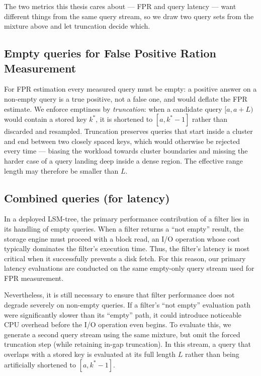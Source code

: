The two metrics this thesis cares about --- FPR and query latency
--- want different things from the same query stream, so we draw
two query sets from the mixture above and let truncation decide
which.

\subsection{Empty queries for False Positive Ration Measurement}
\label{subsec:queries-empty}

For FPR estimation every measured query must be empty: a positive
answer on a non-empty query is a true positive, not a false one,
and would deflate the FPR estimate. We enforce emptiness by
\emph{truncation}: when a candidate query $[a, a+L)$ would contain
a stored key $k^*$, it is shortened to $[a, k^* - 1]$ rather than
discarded and resampled. Truncation preserves queries that start
inside a cluster and end between two closely spaced keys, which
would otherwise be rejected every time --- biasing the workload
towards cluster boundaries and missing the harder case of a query
landing deep inside a dense region. The effective range length
may therefore be smaller than $L$.

\subsection{Combined queries (for latency)}
\label{subsec:queries-combined}

In a deployed LSM-tree, the primary performance contribution of a filter
lies in its handling of empty queries. When a filter returns a
``not empty'' result, the storage engine must proceed with a block read,
an I/O operation whose cost typically dominates the filter's execution time.
Thus, the filter's latency is most critical when it successfully prevents
a disk fetch. For this reason, our primary latency evaluations are
conducted on the same empty-only query stream used for FPR measurement.

Nevertheless, it is still necessary to ensure that filter performance does
not degrade severely on non-empty queries. If a filter's ``not empty''
evaluation path were significantly slower than its ``empty'' path, it could
introduce noticeable CPU overhead before the I/O operation even begins.
To evaluate this, we generate a second query stream using the same mixture,
but omit the forced truncation step (while retaining in-gap truncation).
In this stream, a query that overlaps with a stored key is evaluated at
its full length $L$ rather than being artificially shortened to $[a, k^* - 1]$.


